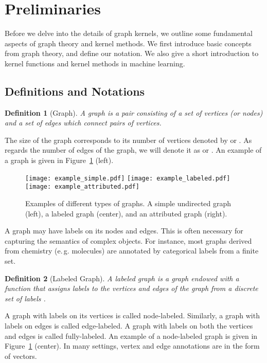\documentclass[twoside,11pt]{article}
\newcommand{\eg}{e.\,g. }
\newtheorem{definition}{Definition}
\begin{document}
\section{Preliminaries}\label{sec:preliminaries}
Before we delve into the details of graph kernels, we outline some fundamental aspects of graph theory and kernel methods. 
We first introduce basic concepts from graph theory, and define our notation.
We also give a short introduction to kernel functions and kernel methods in machine learning.

\subsection{Definitions and Notations}
\begin{definition}[Graph]
    A graph is a pair  consisting of a set of vertices (or nodes)  and a set of edges  which connect pairs of vertices. 
\end{definition}
The size of the graph corresponds to its number of vertices denoted by  or .
As regards the number of edges of the graph, we will denote it as  or .
An example of a graph is given in Figure~\ref{fig:example_graphs} (left).
\begin{figure}[t]
    \centering
    \subfloat
    {\texttt{[image: example\_simple.pdf]}} \qquad \qquad
    \subfloat
    {\texttt{[image: example\_labeled.pdf]}} \qquad \qquad
    \subfloat
    {\texttt{[image: example\_attributed.pdf]}} 
    \caption{Examples of different types of graphs. A simple undirected graph (left), a labeled graph (center), and an attributed graph (right).}
    \label{fig:example_graphs}
\end{figure}
A graph may have labels on its nodes and edges.
This is often necessary for capturing the semantics of complex objects.
For instance, most graphs derived from chemistry (\eg molecules) are annotated by categorical labels from a finite set.
\begin{definition}[Labeled Graph]
    A labeled graph is a graph  endowed with a function  that assigns labels to the vertices and edges of the graph from a discrete set of labels .
\end{definition}
A graph with labels on its vertices is called node-labeled.
Similarly, a graph with labels on edges is called edge-labeled. 
A graph with labels on both the vertices and edges is called fully-labeled.
An example of a node-labeled graph is given in Figure~\ref{fig:example_graphs} (center).
In many settings, vertex and edge annotations are in the form of vectors.
\end{document}
